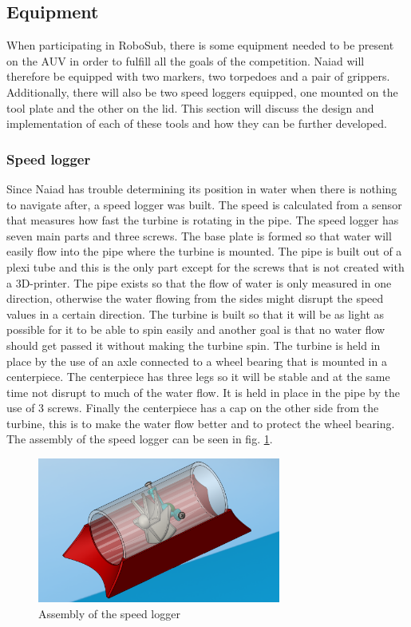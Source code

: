\subsection{Equipment} %
\noindent When participating in RoboSub, there is some equipment needed to be present on the AUV in order to fulfill all the goals of the competition. Naiad will therefore be equipped with two markers, two torpedoes and a pair of grippers. Additionally, there will also be two speed loggers equipped, one mounted on the tool plate and the other on the lid. This section will discuss the design and implementation of each of these tools and how they can be further developed.   

\subsubsection{Speed logger} %
\label{SL_mec}
Since Naiad has trouble determining its position in water when there is nothing to navigate after, a speed logger was built. The speed is calculated from a sensor that measures how fast the turbine is rotating in the pipe. The speed logger has seven main parts and three screws. The base plate is formed so that water will easily flow into the pipe where the turbine is mounted. The pipe is built out of a plexi tube and this is the only part except for the screws that is not created with a 3D-printer. The pipe exists so that the flow of water is only measured in one direction, otherwise the water flowing from the sides might disrupt the speed values in a certain direction. The turbine is built so that it will be as light as possible for it to be able to spin easily and another goal is that no water flow should get passed it without making the turbine spin. The turbine is held in place by the use of an axle connected to a wheel bearing that is mounted in a centerpiece. The centerpiece has three legs so it will be stable and at the same time not disrupt to much of the water flow. It is held in place in the pipe by the use of 3 screws. Finally the centerpiece has a cap on the other side from the turbine, this is to make the water flow better and to protect the wheel bearing.  The assembly of the speed logger can be seen in fig. \ref{SpeedloggerImg}.

\begin{figure}[!ht]
	\begin{center}
		\includegraphics[width=80mm]{./Images/Mechanics/SpeedloggerImg.png}
		\caption{Assembly of the speed logger}
		\label{SpeedloggerImg}
	\end{center}
\end{figure}


